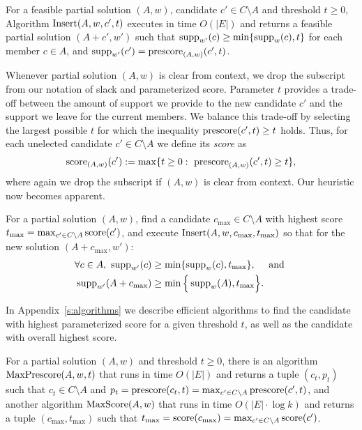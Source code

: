 \begin{lemma}\label{lem:insert}
For a feasible partial solution $(A,w)$, candidate $c'\in C\setminus A$ and threshold $t\geq 0$, 
Algorithm $\operatorname{Insert}(A,w,c',t)$ executes in time $O(|E|)$ and returns a feasible partial solution $(A+c',w')$ 
such that $\operatorname{supp}_{w'}(c)\geq \min\{\operatorname{supp}_w(c),t\}$ for each member $c\in A$, and $\operatorname{supp}_{w'}(c')=\operatorname{prescore}_{(A,w)}(c',t)$. 
\end{lemma}

Whenever partial solution $(A,w)$ is clear from context, we drop the subscript from our notation of slack and parameterized score. %
%
Parameter $t$ provides a trade-off between the amount of support we provide to the new candidate $c'$ and the support we leave for the current members. We balance this trade-off by selecting the largest possible $t$ for which the inequality $\operatorname{prescore}(c',t)\geq t$ holds.
Thus, for each unelected candidate $c'\in C\setminus A$ we define its \emph{score} as 
%
\begin{align}
    \operatorname{score}_{(A,w)}(c'):=\max\{t\geq 0: \ \operatorname{prescore}_{(A,w)}(c',t)\geq t\},
\end{align}
%
where again we drop the subscript if $(A,w)$ is clear from context. Our heuristic now becomes apparent.

\begin{heuristic}
For a partial solution $(A,w)$, find a candidate $c_{\max}\in C\setminus A$ with highest score $t_{\max}=\max_{c'\in C\setminus A} \operatorname{score}(c')$, and execute $\operatorname{Insert}(A,w,c_{\max},t_{\max})$ so that for the new solution $(A+c_{\max},w')$: 
%
\begin{align*}
\forall c\in A, \ \operatorname{supp}_{w'}(c) &\geq \min\{\operatorname{supp}_w(c), t_{\max}\}, \quad \text{ and } \\
 \operatorname{supp}_{w'}(A+c_{\max}) &\geq \min \Big\{ \operatorname{supp}_w(A), t_{\max}\Big\}.
\end{align*}
\end{heuristic}

In Appendix~\ref{s:algorithms} we describe efficient algorithms to find the candidate with highest parameterized score for a given threshold $t$, as well as the candidate with overall highest score.

\begin{theorem}\label{thm:runtimes}
For a partial solution $(A,w)$ and threshold $t\geq 0$, there is an algorithm $\operatorname{MaxPrescore}(A,w,t)$ that runs in time $O(|E|)$ and returns a tuple $(c_t,p_t)$ such that $c_t\in C\setminus A$ and $p_t=\operatorname{prescore}(c_t,t)=\max_{c'\in C\setminus A} \operatorname{prescore}(c',t)$, 
and another algorithm $\operatorname{MaxScore}(A,w)$ that runs in time $O(|E|\cdot \log k)$ and returns a tuple $(c_{\max}, t_{\max})$ such that $t_{\max}=\operatorname{score}(c_{\max})=\max_{c'\in C\setminus A} \operatorname{score}(c')$.
\end{theorem}

